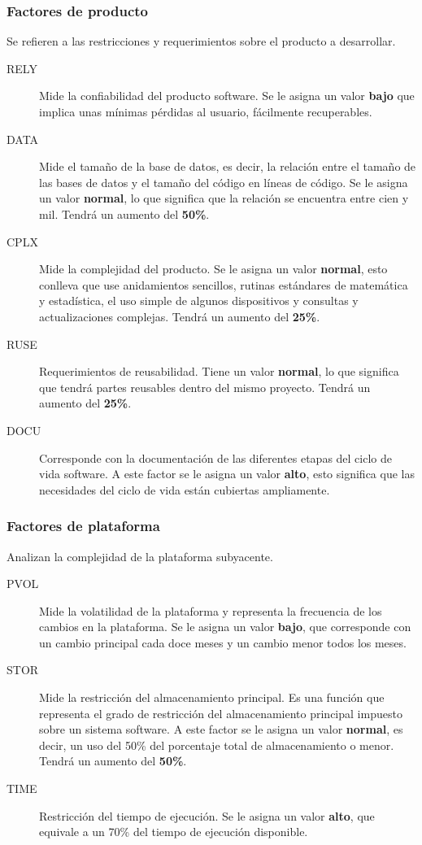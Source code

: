 \documentclass[11pt,a4paper,spanish,twoside]{report}
\begin{document}
\subsubsection{Factores de producto}
Se refieren a las restricciones y requerimientos sobre el producto a
desarrollar.
\begin{description}
\item[RELY] Mide la confiabilidad del producto software. Se le asigna un 
valor \textbf{bajo} que implica unas mínimas pérdidas al usuario,
fácilmente recuperables.

\item[DATA] Mide el tamaño de la base de datos, es decir, la relación entre
el tamaño de las bases de datos y el tamaño del código en líneas de código. Se
le asigna un valor \textbf{normal}, lo que significa que la relación se
encuentra entre cien y mil. Tendrá un aumento del \textbf{50\%}. 

\item[CPLX] Mide la complejidad del producto. Se le asigna un
valor \textbf{normal}, esto conlleva que use anidamientos sencillos, rutinas
estándares de matemática y estadística, el uso simple de algunos dispositivos
y consultas y actualizaciones complejas. Tendrá un aumento del 
\textbf{25\%}.

\item[RUSE] Requerimientos de reusabilidad. Tiene un valor \textbf{normal},
lo que significa que tendrá partes reusables dentro del mismo
proyecto. Tendrá un aumento del \textbf{25\%}.

\item[DOCU] Corresponde con la documentación de las diferentes etapas del
ciclo de vida software. A este factor se le asigna un valor \textbf{alto},
esto significa que las necesidades del ciclo de vida están cubiertas
ampliamente.
\end{description}

\subsubsection{Factores de plataforma}
Analizan la complejidad de la plataforma subyacente.
\begin{description}
\item[PVOL] Mide la volatilidad de la plataforma y representa la frecuencia de
  los cambios en la plataforma. Se le asigna un valor \textbf{bajo}, que
  corresponde con un cambio principal cada doce meses y un cambio menor todos
  los meses.

\item[STOR] Mide la restricción del almacenamiento principal. Es una función
  que representa el grado de restricción del almacenamiento principal
  impuesto sobre un sistema software. A este factor se le asigna un valor
  \textbf{normal}, es decir, un uso del 50\% del porcentaje total de
  almacenamiento o menor. Tendrá un aumento del \textbf{50\%}.

\item[TIME] Restricción del tiempo de ejecución. Se le asigna un valor
  \textbf{alto}, que equivale a un 70\% del tiempo de ejecución disponible.
\end{description}
\end{document}
